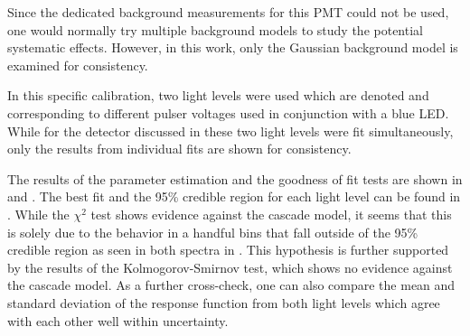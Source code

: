 Since the dedicated background measurements for this PMT could not be used, one would normally try multiple background models to study the potential systematic effects.  However, in this work, only the Gaussian background model is examined for consistency.

In this specific calibration, two light levels were used which are denoted  and  corresponding to different pulser voltages used in conjunction with a blue LED.  While for the detector discussed in  these two light levels were fit simultaneously, only the results from individual fits are shown for consistency.

The results of the parameter estimation and the goodness of fit tests are shown in  and .  The best fit and the 95\% credible region for each light level can be found in .  While the $\chi^2$ test shows evidence against the cascade model, it seems that this is solely due to the behavior in a handful bins that fall outside of the 95\% credible region as seen in both spectra in .  This hypothesis is further supported by the results of the Kolmogorov-Smirnov test, which shows no evidence against the cascade model.  As a further cross-check, one can also compare the mean and standard deviation of the response function from both light levels which agree with each other well within uncertainty.


